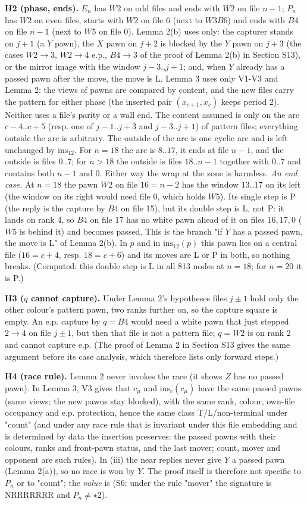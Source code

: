 \textbf{H2 (phase, ends).} $E_n$ has $W2$ on odd files and ends with $W2$ on file $n-1$; $P_n$ has $W2$ on even files, starts with $W2$ on file 6 (next to $W3B6$) and ends with $B4$ on file $n-1$ (next to $W5$ on file 0). Lemma 2(b) uses only: the capturer stands on $j+1$ (a $Y$ pawn), the $X$ pawn on $j+2$ is blocked by the $Y$ pawn on $j+3$ (the cases $W2\to3$, $W2\to4$ e.p., $B4\to3$ of the proof of Lemma 2(b) in Section S13), or the mirror image with the window $j-3..j+1$; and, when $Y$ already has a passed pawn after the move, the move is L. Lemma 3 uses only V1-V3 and Lemma 2: the views of pawns are compared by content, and the new files carry the pattern for either phase (the inserted pair $(x_{c+1},x_c)$ keeps period 2). Neither uses a file's parity or a wall end. The content assumed is only on the arc $c-4..c+5$ (resp. one of $j-1..j+3$ and $j-3..j+1$) of pattern files; everything outside the arc is arbitrary. The outside of the arc is one cyclic arc and is left unchanged by $\mathrm{ins}_{12}$. For $n=18$ the arc is $8..17$, it ends at file $n-1$, and the outside is files $0..7$; for $n>18$ the outside is files $18..n-1$ together with $0..7$ and contains both $n-1$ and $0$. Either way the wrap at the zone is harmless. \emph{An end case.} At $n=18$ the pawn $W2$ on file $16=n-2$ has the window $13..17$ on its left (the window on its right would need file 0, which holds $W5$). Its single step is P (the reply is the capture by $B4$ on file 15), but its double step is L, not P: it lands on rank 4, so $B4$ on file 17 has no white pawn ahead of it on files $16,17,0$ ($W5$ is behind it) and becomes passed. This is the branch "if $Y$ has a passed pawn, the move is L" of Lemma 2(b). In $p$ and in $\mathrm{ins}_{12}(p)$ this pawn lies on a central file ($16=c+4$, resp. $18=c+6$) and its moves are L or P in both, so nothing breaks. (Computed: this double step is L in all 813 nodes at $n=18$; for $n=20$ it is P.)

\textbf{H3 ($q$ cannot capture).} Under Lemma 2's hypotheses files $j\pm1$ hold only the other colour's pattern pawn, two ranks further on, so the capture square is empty. An e.p. capture by $q=B4$ would need a white pawn that just stepped $2\to4$ on file $j\pm1$, but then that file is not a pattern file; $q=W2$ is on rank 2 and cannot capture e.p. (The proof of Lemma 2 in Section S13 gives the same argument before its case analysis, which therefore lists only forward steps.)

\textbf{H4 (race rule).} Lemma 2 never invokes the race (it shows $Z$ has no passed pawn). In Lemma 3, V3 gives that $c_\mu$ and $\mathrm{ins}_c(c_\mu)$ have the same passed pawns (same views; the new pawns stay blocked), with the same rank, colour, own-file occupancy and e.p. protection, hence the same class T/L/non-terminal under "count" (and under any race rule that is invariant under this file embedding and is determined by data the insertion preserves: the passed pawns with their colours, ranks and front-pawn status, and the last mover; count, mover and opponent are such rules). In (iii) the near replies never give $Y$ a passed pawn (Lemma 2(a)), so no race is won by $Y$. The proof itself is therefore not specific to $P_n$ or to "count"; the \emph{value} is (S6: under the rule "mover" the signature is NRRRRRRR and $P_n\ne\star2$).

